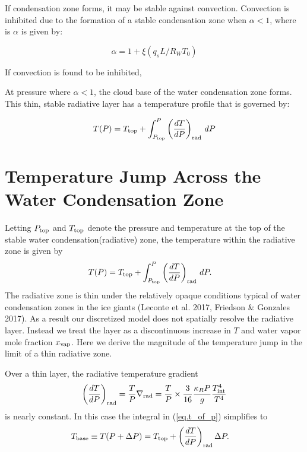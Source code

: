 \documentclass[11pt]{ucscthesisbs}
\begin{document}
If condensation zone forms, it may be stable against convection. Convection is inhibited due to the formation of a stable condensation zone when $\alpha < 1$, where is $\alpha$ \citep{friedson_2017} is given by:

\begin{equation}
  \alpha = 1 + \xi (q_{s} L / R_{W} T_{0}) 
\end{equation}

If convection is found to be inhibited,  

At pressure where $\alpha < 1$, the cloud base of the water condensation zone forms. This thin, stable radiative layer has a temperature profile that is governed by:

\begin{equation}
	T(P) = T_{\rm top} + \int_{P_{\rm top}}^P\left(\frac{dT}{dP}\right)_{\rm rad}\,d P
\end{equation}

\section{Temperature Jump Across the Water Condensation Zone}
Letting $P_{\rm top}$ and $T_{\rm top}$ denote the pressure and temperature at the top of the stable water condensation(radiative) zone, the temperature within the radiative zone is given by
\begin{align}
T(P) &= T_{\rm top} + \int_{P_{\rm top}}^P\left(\frac{dT}{dP}\right)_{\rm rad}\,d P. \label{eq.t_of_p}
\end{align}
The radiative zone is thin under the relatively opaque conditions typical of water condensation zones in the ice giants (Leconte et al. 2017, Friedson \& Gonzales 2017). As a result our discretized model does not spatially resolve the radiative layer. Instead we treat the layer as a discontinuous increase in $T$ and water vapor mole fraction $x_{\rm vap}$. Here we derive the magnitude of the temperature jump in the limit of a thin radiative zone.

Over a thin layer, the radiative temperature gradient
\begin{align}
  \left(\frac{dT}{dP}\right)_{\rm rad}=\frac{T}{P}\nabla_{\rm rad}
  = \frac{T}{P}\times\frac{3}{16}\frac{\kappa_R P}{g}\frac{T_{\rm int}^4}{T^4}
\end{align}
is nearly constant. In this case the integral in (\ref{eq.t_of_p}) simplifies to
\begin{align}
T_{\rm base}\equiv T(P+\Delta P) &= T_{\rm top} + \left(\frac{dT}{dP}\right)_{\rm rad}\Delta P.\label{eq.t1}
\end{align}
\end{document}
